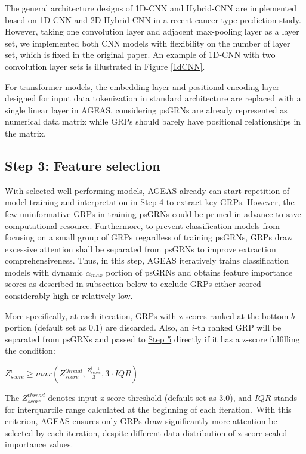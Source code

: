 \documentclass[fleqn,10pt]{wlscirep}
\begin{document}
    The general architecture designs of 1D-CNN and Hybrid-CNN are implemented based on 1D-CNN and 2D-Hybrid-CNN in a recent cancer type prediction study.\cite{mostavi_chiu_huang_chen_2020}
    However, taking one convolution layer and adjacent max-pooling layer as a layer set, we implemented both CNN models with flexibility on the number of layer set, which is fixed in the original paper.
    An example of 1D-CNN with two convolution layer sets is illustrated in Figure \ref{1dCNN}.

    For transformer models, the embedding layer and positional encoding layer designed for input data tokenization in standard architecture \cite{transformer} are replaced with a single linear layer in AGEAS, considering psGRNs are already represented as numerical data matrix while GRPs should barely have positional relationships in the matrix.

  \subsection*{Step 3: Feature selection}
    \label{step3}
    With selected well-performing models, AGEAS already can start repetition of model training and interpretation in \hyperref[step4]{Step 4} to extract key GRPs.
    However, the few uninformative GRPs in training psGRNs could be pruned in advance to save computational resource.
    Furthermore, to prevent classification models from focusing on a small group of GRPs regardless of training psGRNs, GRPs draw excessive attention shall be separated from psGRNs to improve extraction comprehensiveness.
    Thus, in this step, AGEAS iteratively trains classification models with dynamic $\alpha_{max}$ portion of psGRNs and obtains feature importance scores as described in \hyperref[features_importances]{subsection} below to exclude GRPs either scored considerably high or relatively low.

    More specifically, at each iteration, GRPs with z-scores ranked at the bottom $b$ portion (default set as 0.1) are discarded.
    Also, an $i$-th ranked GRP will be separated from psGRNs and passed to \hyperref[step5]{Step 5} directly if it has a z-score fulfilling the condition:

    \centerline{
      $Z_{score}^{i} \ge max(Z_{score}^{thread}, \frac{Z_{score}^{i-1}}{3}, 3 \cdot IQR)$
    }

    \noindent The $Z_{score}^{thread}$ denotes input z-score threshold (default set as 3.0), and $IQR$ stands for interquartile range calculated at the beginning of each iteration.\
    With this criterion, AGEAS ensures only GRPs draw significantly more attention be selected by each iteration, despite different data distribution of z-score scaled importance values.
\end{document}

